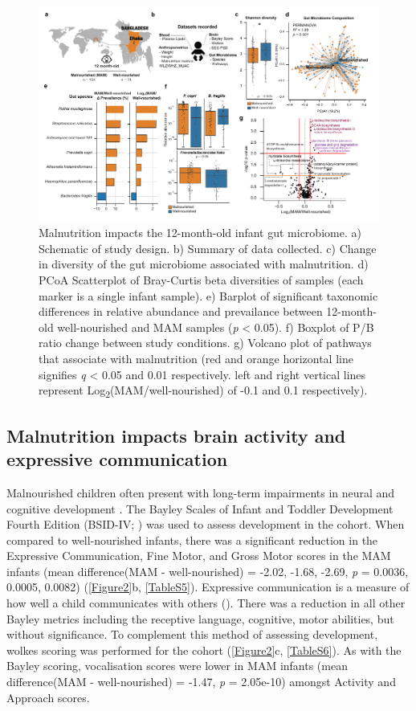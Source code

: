 \documentclass{article}
\begin{document}
\begin{figure}[!htb]
\centering
\includegraphics[scale=0.9]{../../figures/Figure1-microbiome.pdf}
\caption[Malnutrition impacts the 12-month-old infant gut microbiome]{
	Malnutrition impacts the 12-month-old infant gut microbiome.
	a) Schematic of study design.
	b) Summary of data collected.
	c) Change in diversity of the gut microbiome associated with malnutrition.
	d) PCoA Scatterplot of Bray-Curtis beta diversities of samples (each marker is a single infant sample).
	e) Barplot of significant taxonomic differences in relative abundance and prevailance between 12-month-old well-nourished and \gls{MAM} samples (\textit{p} \textless{} 0.05).
	f) Boxplot of \gls{P/B} ratio change between study conditions.
	g) Volcano plot of pathways that associate with malnutrition (red and orange horizontal line signifies \textit{q} \textless{} 0.05 and 0.01 respectively. left and right vertical lines represent Log\textsubscript{2}(\gls{MAM}/well-nourished) of -0.1 and 0.1 respectively).}
\label{Figure1}
\end{figure}

\subsection*{Malnutrition impacts brain activity and expressive communication}
Malnourished children often present with long-term impairments in neural and cognitive development \cite{martins2011long}.
The Bayley Scales of Infant and Toddler Development Fourth Edition (BSID-IV; \cite{Bayley2019}) was used to assess development in the cohort.
When compared to well-nourished infants, there was a significant reduction in the Expressive Communication, Fine Motor, and Gross Motor scores in the \gls{MAM} infants (mean difference(\gls{MAM} - well-nourished) = -2.02, -1.68, -2.69, \textit{p} = 0.0036, 0.0005, 0.0082) (\autoref{Figure2}b, \autoref{TableS5}).
Expressive communication is a measure of how well a child communicates with others ().
There was a reduction in all other Bayley metrics including the receptive language, cognitive, motor abilities, but without significance.
To complement this method of assessing development, wolkes scoring was performed for the cohort (\autoref{Figure2}c, \autoref{TableS6}).
As with the Bayley scoring, vocalisation scores were lower in \gls{MAM} infants (mean difference(\gls{MAM} - well-nourished) = -1.47, \textit{p} = 2.05e-10) amongst Activity and Approach scores.
\end{document}

